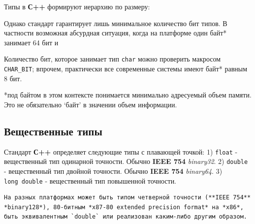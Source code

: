 Типы в \textbf{С++} формируют иерархию по размеру:

\begin{Shaded}
\begin{Highlighting}[]
     \OperatorTok{==} \OperatorTok{(}\OperatorTok{)}\OperatorTok{(}\OperatorTok{)}\OperatorTok{(}\OperatorTok{)}\OperatorTok{(}\OperatorTok{)}\OperatorTok{(} \OperatorTok{)}
\end{Highlighting}
\end{Shaded}

Однако стандарт гарантирует лишь минимальное количество бит типов. В
частности возможная абсурдная ситуация, когда на платформе один байт*
занимает 64 бит и

\begin{Shaded}
\begin{Highlighting}[]
    \OperatorTok{(}\OperatorTok{)} \OperatorTok{==} \OperatorTok{(}\OperatorTok{)} \OperatorTok{==} \OperatorTok{(}\OperatorTok{)} \OperatorTok{==} \OperatorTok{(}\OperatorTok{)} \OperatorTok{==} \OperatorTok{(} \OperatorTok{)} \OperatorTok{==} 
\end{Highlighting}
\end{Shaded}

Количество бит, которое занимает тип \texttt{char} можно проверить
макросом \texttt{CHAR\_BIT}; впрочем, практически все современные
системы имеют байт* равным 8 бит.

*под байтом в этом контексте понимается минимально адресуемый объем
памяти. Это не обязательно `байт' в значении объем информации.

\subsection{Вещественные
типы}\label{ux432ux435ux449ux435ux441ux442ux432ux435ux43dux43dux44bux435-ux442ux438ux43fux44b}

Стандарт \textbf{С++} определяет следующие типы с плавающей точкой: 1)
\texttt{float} - вещественный тип одинарной точности. Обычно
\textbf{IEEE 754} \emph{binary32}. 2) \texttt{double} - вещественный тип
двойной точности. Обычно \textbf{IEEE 754} \emph{binary64}. 3)
\texttt{long\ double} - вещественный тип повышенной точности.

\begin{verbatim}
На разных платформах может быть типом четверной точности (**IEEE 754** *binary128*), 80-битным *x87-80 extended precision format* на *x86*, быть эквивалентным `double` или реализован каким-либо другим образом.
\end{verbatim}
